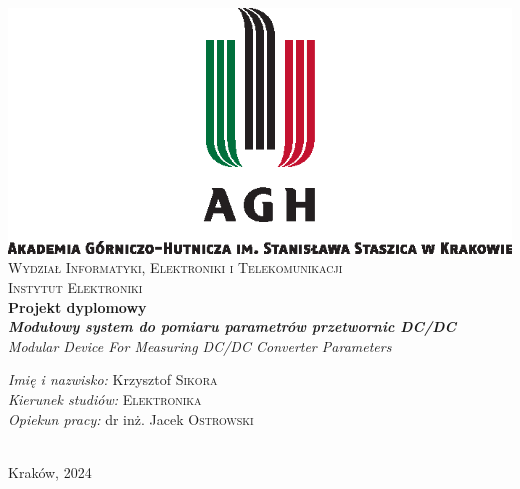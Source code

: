 \begin{titlepage}

\begin{center}

\includegraphics[scale=1.25]{agh_nzw_s_pl_1w_wbr_pms}\\[0.2cm]

\textsc{Wydział Informatyki, Elektroniki i Telekomunikacji}\\[0.2cm]

\textsc{Instytut Elektroniki}\\[1cm]

\textbf{Projekt dyplomowy}\\[1cm]

{\huge \bfseries \textit{Modułowy system do pomiaru parametrów przetwornic DC/DC}}\\[1cm]

{\huge \textit{Modular Device For Measuring DC/DC Converter Parameters}}\\

\vfill

\begin{minipage}{0.8\textwidth}
\begin{flushleft}
{\large \emph{Imię i nazwisko:} \hfill Krzysztof \textsc{Sikora}}\\[0.1cm]
{\large \emph{Kierunek studiów:} \hfill \textsc{Elektronika}}\\[0.1cm]
{\large \emph{Opiekun pracy:} \hfill dr inż. Jacek \textsc{Ostrowski}}
\end{flushleft}
\end{minipage}\\[2cm]

Kraków, 2024

\end{center}

\end{titlepage}
